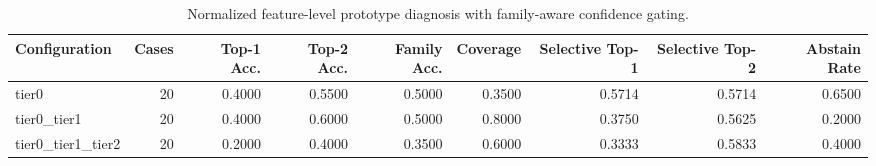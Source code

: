 \begin{table}[t]
\centering
\caption{Normalized feature-level prototype diagnosis with family-aware confidence gating.}
\label{tab:dice_stressor_hierarchical_diagnosis}
\footnotesize
\begin{tabular}{lrrrrrrrr}
\toprule
Configuration & Cases & Top-1 Acc. & Top-2 Acc. & Family Acc. & Coverage & Selective Top-1 & Selective Top-2 & Abstain Rate \\
\midrule
tier0 & 20 & 0.4000 & 0.5500 & 0.5000 & 0.3500 & 0.5714 & 0.5714 & 0.6500 \\
tier0_tier1 & 20 & 0.4000 & 0.6000 & 0.5000 & 0.8000 & 0.3750 & 0.5625 & 0.2000 \\
tier0_tier1_tier2 & 20 & 0.2000 & 0.4000 & 0.3500 & 0.6000 & 0.3333 & 0.5833 & 0.4000 \\
\bottomrule
\end{tabular}

\end{table}
